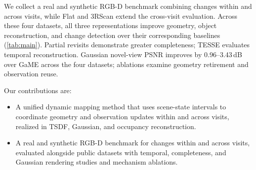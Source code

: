 We collect a real and synthetic RGB-D benchmark combining changes within and across visits, while Flat and 3RScan extend
the cross-visit evaluation. Across these four datasets, all three representations
improve geometry, object reconstruction, and change detection over their corresponding baselines
(\cref{tab:main}). Partial revisits demonstrate greater completeness; TESSE evaluates temporal
reconstruction. Gaussian novel-view PSNR improves by 0.96--3.43\,dB over GaME
across the four datasets; ablations examine geometry retirement and observation reuse.

\begin{samepage}
Our contributions are:
\begin{itemize}
  \item A unified dynamic mapping method that uses scene-state intervals to coordinate geometry and observation
  updates within and across visits, realized in TSDF, Gaussian, and occupancy reconstruction.
  \item A real and synthetic RGB-D benchmark for changes within and across visits, evaluated alongside
  public datasets with temporal, completeness, and Gaussian rendering studies and mechanism ablations.
\end{itemize}
\end{samepage}
